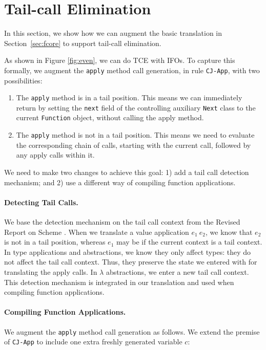 \section{Tail-call Elimination}\label{sec:tce}

In this section, we show how we can augment the basic translation in
Section~\ref{sec:fcore} to support tail-call elimination.
 
As shown in Figure \ref{fig:even}, we can do TCE
with IFOs. To capture this formally, we augment the
\lstinline{apply} method call generation, in rule \texttt{CJ-App}, with two possibilities:

\begin{enumerate}

\item The \lstinline{apply} method is in a tail position. This means we can
  immediately return by setting the \texttt{next} field of the
  controlling auxiliary \lstinline{Next} class to the current \lstinline{Function} object,
  without calling the apply method.

\item The \lstinline{apply} method is not in a tail position. This means we
  need to evaluate the corresponding chain of calls, starting with the
  current call, followed by any apply calls within it. 

\end{enumerate}

We need to make two changes to achieve this goal: 1) add a tail call
detection mechanism; and 2) use a different way of compiling function
applications.

\paragraph{Detecting Tail Calls.}
We base the detection mechanism on the tail call context from the
Revised Report on Scheme \cite{Abelson1998}. When we translate a value
application $e_1~e_2$, we know that $e_2$ is not in a tail position,
whereas $e_1$ may be if the current context is a tail context.  In
type applications and abstractions, we know they only affect types: they do not
affect the tail call context.  Thus, they preserve the state we
entered with for translating the apply calls. In $\lambda$
abstractions, we enter a new tail call context. This detection mechanism 
is integrated in our translation and used when compiling function applications.

\paragraph{Compiling Function Applications.}
We augment the \lstinline{apply} method call generation as follows. We extend the 
premise of \texttt{CJ-App} to include one extra freshly generated variable $c$: 

